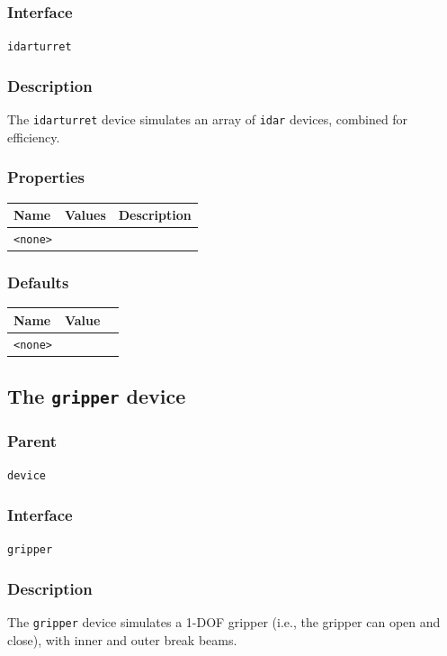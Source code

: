 \documentclass[11pt,twoside]{report}
\begin{document}
\subsubsection*{Interface}
{\tt idarturret}

\subsubsection*{Description}
The {\tt idarturret} device simulates an array of \verb'idar'
devices, combined for efficiency.

\subsubsection*{Properties}
\begin{tabularx}{\columnwidth}{llX}
\hline
Name & Values & Description \\
\hline
\verb'<none>'\\
\hline
\end{tabularx}

\subsubsection*{Defaults}
\begin{tabularx}{\columnwidth}{llX}
\hline
Name & Value\\
\hline
\verb'<none>'\\
\hline
\end{tabularx}

\newpage
\subsection{The {\tt gripper} device}


\subsubsection*{Parent}
{\tt device}

\subsubsection*{Interface}
{\tt gripper}

\subsubsection*{Description}
The {\tt gripper} device simulates a 1-DOF gripper (i.e., the gripper
can open and close), with inner and outer break beams.
\end{document}
